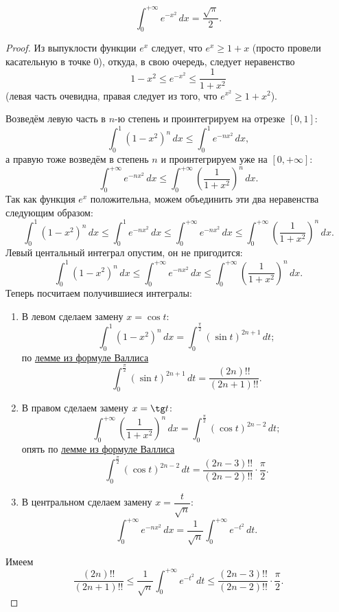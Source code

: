 \hypertarget{puas}{}
\begin{theorem}
	\[
		\int_0^{+\infty} e^{-x^2} \, dx = \frac{\sqrt{\pi}}{2}.
	\]
\end{theorem}

\begin{proof}
	Из выпуклости функции \(e^x\) следует, что \(e^x \geqslant 1 + x\) (просто провели касательную в точке \(0\)), откуда, в свою очередь, следует неравенство \[
		1 - x^2 \leqslant e^{-x^2} \leqslant \frac{1}{1 + x^2}
	\]
	(левая часть очевидна, правая следует из того, что \(e^{x^2} \geqslant 1 + x^2\)).
	
	Возведём левую часть в \(n\)-ю степень и проинтегрируем на отрезке \([0, 1]\): \[
		\int_0^1 (1 - x^2)^n \, dx \leqslant \int_0^1 e^{-nx^2} \, dx,
	\]
	а правую тоже возведём в степень \(n\) и проинтегрируем уже на \([0, +\infty]\): \[
			\int_0^{+\infty} e^{-nx^2} \, dx \leqslant \int_0^{+\infty} \left(\frac{1}{1 + x^2} \right)^n \, dx.
	\]
	Так как функция \(e^x\) положительна, можем объединить эти два неравенства следующим образом: \[
		\int_0^1 (1 - x^2)^n \, dx \leqslant \int_0^1 e^{-nx^2} \, dx \leqslant \int_0^{+\infty} e^{-nx^2} \, dx \leqslant \int_0^{+\infty} \left(\frac{1}{1 + x^2} \right)^n \, dx.
	\]
	Левый центальный интеграл опустим, он не пригодится: \[
		\int_0^1 (1 - x^2)^n \, dx \leqslant \int_0^{+\infty} e^{-nx^2} \, dx \leqslant \int_0^{+\infty} \left(\frac{1}{1 + x^2} \right)^n \, dx.
	\]
	Теперь посчитаем получившиеся интегралы:
	\begin{enumerate}
		\item В левом сделаем замену \(x = \cos t\): \[
			\int_0^1 (1 - x^2)^n \, dx = \int_0^{\frac{\pi}{2}} (\sin t)^{2n + 1} \, dt;
		\]
		по \hyperlink{vallem}{лемме из формуле Валлиса} \[
			\int_0^{\frac{\pi}{2}} (\sin t)^{2n + 1} \, dt = \frac{(2n)!!}{(2n + 1)!!}.
		\]
		\item В правом сделаем замену \(x = \tg t\): \[
			\int_0^{+\infty} \left(\frac{1}{1 + x^2} \right)^n \, dx = \int_{0}^{\frac{\pi}{2}} (\cos t)^{2n - 2} \, dt;
		\]
		опять по \hyperlink{vallem}{лемме из формуле Валлиса} \[
			\int_{0}^{\frac{\pi}{2}} (\cos t)^{2n - 2} \, dt  = \frac{(2n - 3)!!}{(2n - 2)!!} \cdot \frac{\pi}{2}.
		\]
		\item В центральном сделаем замену \(x = \dfrac{t}{\sqrt{n}}\): \[
			\int_0^{+\infty} e^{-nx^2} \, dx = \frac{1}{\sqrt{n}} \int_0^{+\infty} e^{-t^2} \, dt.
		\]
	\end{enumerate}
	Имеем \[
		\frac{(2n)!!}{(2n + 1)!!} \leqslant \frac{1}{\sqrt{n}} \int_0^{+\infty} e^{-t^2} \, dt \leqslant \frac{(2n - 3)!!}{(2n - 2)!!} \cdot \frac{\pi}{2}.
\]
\end{proof}

